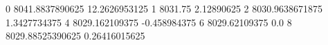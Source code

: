 0 8041.8837890625 12.2626953125
1 8031.75 2.12890625
2 8030.9638671875 1.3427734375
4 8029.162109375 -0.458984375
6 8029.62109375 0.0
8 8029.88525390625 0.26416015625
